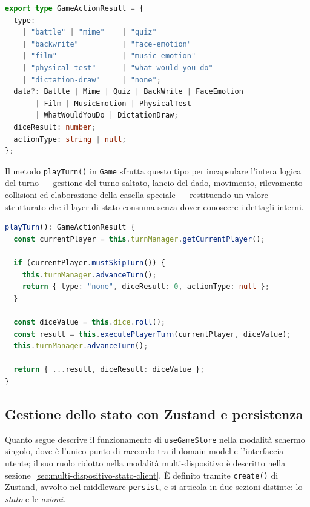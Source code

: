 \documentclass[12pt]{report}
\begin{document}
\begin{lstlisting}[language=TypeScript, caption={Tipo di ritorno di \texttt{playTurn()} (src/model/managers/types.ts)}]
export type GameActionResult = {
  type:
    | "battle" | "mime"    | "quiz"
    | "backwrite"          | "face-emotion"
    | "film"               | "music-emotion"
    | "physical-test"      | "what-would-you-do"
    | "dictation-draw"     | "none";
  data?: Battle | Mime | Quiz | BackWrite | FaceEmotion
       | Film | MusicEmotion | PhysicalTest
       | WhatWouldYouDo | DictationDraw;
  diceResult: number;
  actionType: string | null;
};
\end{lstlisting}

Il metodo \texttt{playTurn()} in \texttt{Game} sfrutta questo tipo per incapsulare l'intera logica del turno --- gestione del turno saltato, lancio del dado, movimento, rilevamento collisioni ed elaborazione della casella speciale --- restituendo un valore strutturato che il layer di stato consuma senza dover conoscere i dettagli interni.

\begin{lstlisting}[language=TypeScript, caption={Metodo \texttt{playTurn()} (src/model/game.ts)}]
playTurn(): GameActionResult {
  const currentPlayer = this.turnManager.getCurrentPlayer();

  if (currentPlayer.mustSkipTurn()) {
    this.turnManager.advanceTurn();
    return { type: "none", diceResult: 0, actionType: null };
  }

  const diceValue = this.dice.roll();
  const result = this.executePlayerTurn(currentPlayer, diceValue);
  this.turnManager.advanceTurn();

  return { ...result, diceResult: diceValue };
}
\end{lstlisting}

\subsection{Gestione dello stato con Zustand e persistenza}

Quanto segue descrive il funzionamento di \texttt{useGameStore} nella modalità schermo singolo, dove è l'unico punto di raccordo tra il domain model e l'interfaccia utente; il suo ruolo ridotto nella modalità multi-dispositivo è descritto nella sezione~\ref{sec:multi-dispositivo-stato-client}.
È definito tramite \texttt{create()} di Zustand, avvolto nel middleware \texttt{persist}, e si articola in due sezioni distinte: lo \textit{stato} e le \textit{azioni}.
\end{document}

